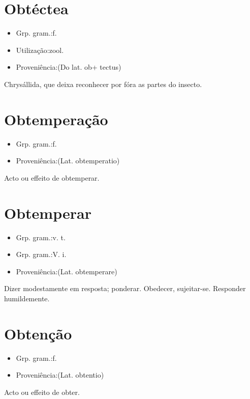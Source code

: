 \section{Obtéctea}
\begin{itemize}
\item {Grp. gram.:f.}
\end{itemize}
\begin{itemize}
\item {Utilização:zool.}
\end{itemize}
\begin{itemize}
\item {Proveniência:(Do lat. \textunderscore ob\textunderscore  + \textunderscore tectus\textunderscore )}
\end{itemize}
Chrysállida, que deixa reconhecer por fóra as partes do insecto.
\section{Obtemperação}
\begin{itemize}
\item {Grp. gram.:f.}
\end{itemize}
\begin{itemize}
\item {Proveniência:(Lat. \textunderscore obtemperatio\textunderscore )}
\end{itemize}
Acto ou effeito de obtemperar.
\section{Obtemperar}
\begin{itemize}
\item {Grp. gram.:v. t.}
\end{itemize}
\begin{itemize}
\item {Grp. gram.:V. i.}
\end{itemize}
\begin{itemize}
\item {Proveniência:(Lat. \textunderscore obtemperare\textunderscore )}
\end{itemize}
Dizer modestamente em resposta; ponderar.
Obedecer, sujeitar-se.
Responder humildemente.
\section{Obtenção}
\begin{itemize}
\item {Grp. gram.:f.}
\end{itemize}
\begin{itemize}
\item {Proveniência:(Lat. \textunderscore obtentio\textunderscore )}
\end{itemize}
Acto ou effeito de obter.
